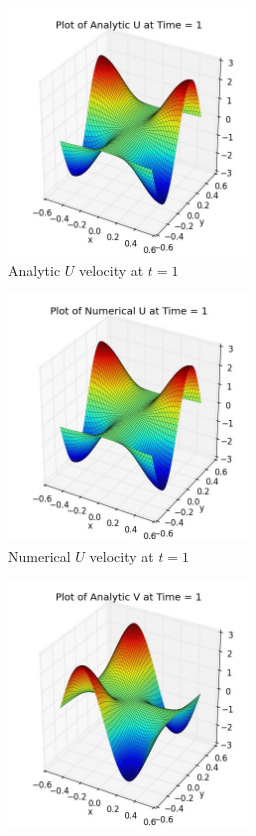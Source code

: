 \begin{figure}[H]
	\centering
	\begin{subfigure}[t]{2.5in}
		\centering
		\includegraphics[width=2.5in]{figures/Pm1b_pf2b_U_exact_t_1_grid_60.jpg}
		\caption{Analytic $U$ velocity at $t=1$}\label{fig:7.1a}		
	\end{subfigure}
	\quad
	\begin{subfigure}[t]{2.5in}
		\centering
		\includegraphics[width=2.5in]{figures/Pm1b_pf2b_uf_t_1_grid_60.jpg}
		\caption{Numerical $U$ velocity at $t=1$}\label{fig:7.1b}
	\end{subfigure}
	\quad
	\begin{subfigure}[t]{2.5in}
		\centering
		\includegraphics[width=2.5in]{figures/Pm1b_pf2b_V_exact_t_1_grid_60.jpg}

\end{subfigure}
\end{figure}
